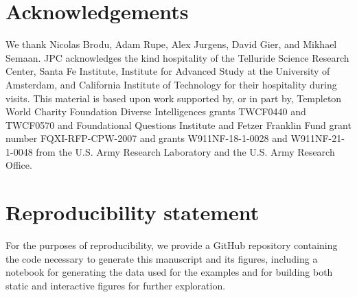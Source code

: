 \documentclass[draft,aps,pre,twocolumn,groupaddress,showkeys,nofootinbib,preprintnumbers,floatfix]{revtex4-2}
\begin{document}
\section*{Acknowledgements}
We thank Nicolas Brodu, Adam Rupe, Alex Jurgens, David Gier, and Mikhael
Semaan. JPC acknowledges the kind hospitality of the Telluride Science
Research Center, Santa Fe Institute, Institute for Advanced Study at the
University of Amsterdam, and California Institute of Technology for their
hospitality during visits. This material is based upon work supported by, or
in part by, Templeton World Charity Foundation Diverse Intelligences grants TWCF0440 and TWCF0570 and Foundational Questions Institute and Fetzer Franklin Fund grant number FQXI-RFP-CPW-2007 and grants W911NF-18-1-0028 and
W911NF-21-1-0048 from the U.S. Army Research Laboratory and the U.S. Army
Research Office.  

\section*{Reproducibility statement}
For the purposes of reproducibility, we provide a 
GitHub repository \cite{repo} containing
the code necessary to generate this manuscript and its figures, including a
notebook for generating the data used for the examples and for building both
static and interactive figures for further exploration.


\end{document}
